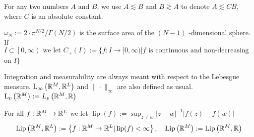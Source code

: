 {For any two numbers $A$ and $B$, we use $A \lesssim B$ and $B \gtrsim A$ to denote $A \lesssim C B$, where $C$ is an absolute constant.




$\omega_{N}:=2 \cdot \pi^{N / 2} / \Gamma(N / 2)$ is the surface area of the $(N-1)$ -dimensional sphere. If $I \subset\left[0, \infty\right)\text { we let } C_{+}(I):=\{f: I \rightarrow[0, \infty)| f\text { is continuous and non-decreasing } $ on $I\}$

Integration and measurability are always meant with respect to the Lebesgue measure. $\mathrm{L}_{\infty}\left({\mathbb{R}}^{M}, {\mathbb{R}}^{L}\right)$ and $\|\cdot\|_{\infty}$ are also defined as usual. $\mathrm{L}_{p}\left({\mathbb{R}}^{M}\right):=L_{p}\left({\mathbb{R}}^{M}, {\mathbb{R}}\right)$

For all $f: {\mathbb{R}}^{M} \rightarrow {\mathbb{R}}^{L}$ we let $\operatorname{lip}(f):=\sup _{z \neq w}|z-w|^{-1}|f(z)-f(w)|$
\[
\operatorname{Lip}\left({\mathbb{R}}^{M}, {\mathbb{R}}^{L}\right):=\left\{f: {\mathbb{R}}^{M} \rightarrow {\mathbb{R}}^{L} | \operatorname{lip}(f)<\infty\right\}, \quad \operatorname{Lip}\left({\mathbb{R}}^{M}\right):=\operatorname{Lip}\left({\mathbb{R}}^{M}, {\mathbb{R}}\right)
\]































}
